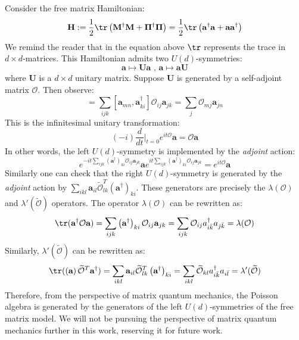 \documentclass[a4paper,11pt]{article}
\theoremstyle{definition}
\numberwithin{equation}{section}
\newcommand{\lb}{\left(}
\newcommand{\rb}{\right)}
\begin{document}
Consider the free matrix Hamiltonian:
\begin{equation}
    \mathbf{H} := \frac{1}{2}\tr\lb\mathbf{M}^\dagger\mathbf{M} + \mathbf{\Pi}^\dagger\mathbf{\Pi}\rb = \frac{1}{2}\tr\lb\mathbf{a}^\dagger\mathbf{a} + \mathbf{a}\mathbf{a}^\dagger\rb
\end{equation}
We remind the reader that in the equation above $\tr$ represents the trace in $d\times d$-matrices. This Hamiltonian admits two $U(d)$-symmetries:
\begin{equation}
    \mathbf{a}\mapsto \mathbf{U}\mathbf{a}\text{ , }\mathbf{a}\mapsto\mathbf{a}\mathbf{U}
\end{equation}
where $\mathbf{U}$ is a $d\times d$ unitary matrix. Suppose $\mathbf{U}$ is generated by a self-adjoint matrix $\mathcal{O}$. Then observe:
\begin{equation}
    [\mathbf{a}_{mn}, \sum_{ijk}\lb\mathbf{a}^\dagger\rb_{ki} \mathcal{O}_{ij}\mathbf{a}_{jk}] = \sum_{ijk}[\mathbf{a}_{mn},\mathbf{a}^\dagger_{ki}]\mathcal{O}_{ij}\mathbf{a}_{jk} = \sum_j\mathcal{O}_{mj}\mathbf{a}_{jn} 
\end{equation}
This is the infinitesimal unitary transformation:
\begin{equation}
    (-i)\frac{d}{dt}|_{t = 0}e^{it\mathcal{O}}\mathbf{a} = \mathcal{O}\mathbf{a}
\end{equation}
In other words, the left $U(d)$-symmetry is implemented by the \textit{adjoint} action:
\begin{equation}
    e^{-it\sum_{ijk}\lb\mathbf{a}^\dagger\rb_{ki}\mathcal{O}_{ij}\mathbf{a}_{jk}} \mathbf{a} e^{it\sum_{ijk}\lb\mathbf{a}^\dagger\rb_{ki}\mathcal{O}_{ij}\mathbf{a}_{jk}} = e^{it\mathcal{O}}\mathbf{a}
\end{equation}
Similarly one can check that the right $U(d)$-symmetry is generated by the \textit{adjoint} action by $\sum_{ikl}\mathbf{a}_{il}\widetilde{\mathcal{O}}^T_{lk}\lb\mathbf{a}^\dagger\rb_{ki}$. These generators are precisely the $\lambda(\mathcal{O})$ and $\lambda'(\widetilde{\mathcal{O}})$ operators. The operator $\lambda(\mathcal{O})$ can be rewritten as:
\begin{equation}
    \tr(\textbf{a}^\dagger\mathcal{O}\textbf{a}) = \sum_{ijk}\lb \textbf{a}^\dagger\rb_{ki}\mathcal{O}_{ij}\textbf{a}_{jk} = \sum_{ijk}\mathcal{O}_{ij}a^\dagger_{i\bar{k}}a_{j\bar{k}} = \lambda(\mathcal{O})
\end{equation}
Similarly, $\lambda'(\widetilde{\mathcal{O}})$ can be rewritten as:
\begin{equation}
    \tr(\lb\textbf{a}\rb \widetilde{\mathcal{O}}^T \textbf{a}^\dagger) = \sum_{ikl}\textbf{a}_{il}\widetilde{\mathcal{O}}^T_{lk}\lb\textbf{a}^\dagger\rb_{ki} = \sum_{ikl}\widetilde{\mathcal{O}}_{kl}a^\dagger_{i\bar{k}}a_{i\bar{l}} = \lambda'(\widetilde{\mathcal{O}})
\end{equation}
Therefore, from the perspective of matrix quantum mechanics, the Poisson algebra is generated by the generators of the left $U(d)$-symmetries of the free matrix model. We will not be pursuing the perspective of matrix quantum mechanics further in this work, reserving it for future work.
\end{document}
